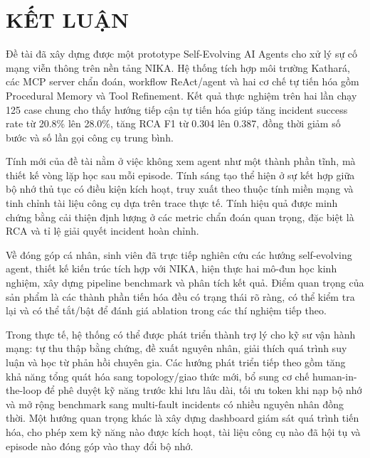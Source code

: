 \section{KẾT LUẬN}

Đề tài đã xây dựng được một prototype Self-Evolving AI Agents cho xử lý sự cố mạng viễn thông trên nền tảng NIKA. Hệ thống tích hợp môi trường Kathará, các MCP server chẩn đoán, workflow ReAct/agent và hai cơ chế tự tiến hóa gồm Procedural Memory và Tool Refinement. Kết quả thực nghiệm trên hai lần chạy 125 case chung cho thấy hướng tiếp cận tự tiến hóa giúp tăng incident success rate từ 20.8\% lên 28.0\%, tăng RCA F1 từ 0.304 lên 0.387, đồng thời giảm số bước và số lần gọi công cụ trung bình.

Tính mới của đề tài nằm ở việc không xem agent như một thành phần tĩnh, mà thiết kế vòng lặp học sau mỗi episode. Tính sáng tạo thể hiện ở sự kết hợp giữa bộ nhớ thủ tục có điều kiện kích hoạt, truy xuất theo thuộc tính miền mạng và tinh chỉnh tài liệu công cụ dựa trên trace thực tế. Tính hiệu quả được minh chứng bằng cải thiện định lượng ở các metric chẩn đoán quan trọng, đặc biệt là RCA và tỉ lệ giải quyết incident hoàn chỉnh.

Về đóng góp cá nhân, sinh viên đã trực tiếp nghiên cứu các hướng self-evolving agent, thiết kế kiến trúc tích hợp với NIKA, hiện thực hai mô-đun học kinh nghiệm, xây dựng pipeline benchmark và phân tích kết quả. Điểm quan trọng của sản phẩm là các thành phần tiến hóa đều có trạng thái rõ ràng, có thể kiểm tra lại và có thể tắt/bật để đánh giá ablation trong các thí nghiệm tiếp theo.

Trong thực tế, hệ thống có thể được phát triển thành trợ lý cho kỹ sư vận hành mạng: tự thu thập bằng chứng, đề xuất nguyên nhân, giải thích quá trình suy luận và học từ phản hồi chuyên gia. Các hướng phát triển tiếp theo gồm tăng khả năng tổng quát hóa sang topology/giao thức mới, bổ sung cơ chế human-in-the-loop để phê duyệt kỹ năng trước khi lưu lâu dài, tối ưu token khi nạp bộ nhớ và mở rộng benchmark sang multi-fault incidents có nhiều nguyên nhân đồng thời. Một hướng quan trọng khác là xây dựng dashboard giám sát quá trình tiến hóa, cho phép xem kỹ năng nào được kích hoạt, tài liệu công cụ nào đã hội tụ và episode nào đóng góp vào thay đổi bộ nhớ.
